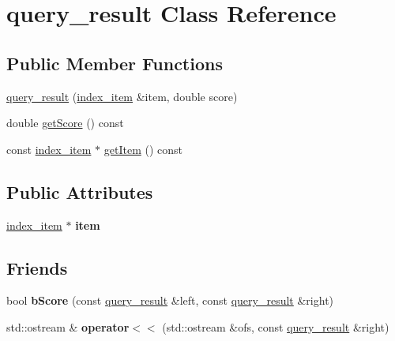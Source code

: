 \hypertarget{classquery__result}{}\section{query\+\_\+result Class Reference}
\label{classquery__result}
\subsection*{Public Member Functions}
\begin{DoxyCompactItemize}
\item 
\hyperlink{classquery__result_a3bfdb6247df84d9076c70a1d41ab2a51}{query\+\_\+result} (\hyperlink{classindex__item}{index\+\_\+item} \&item, double score)
\item 
double \hyperlink{classquery__result_a85702eafe30f0f8bf4c7acb17b761e04}{get\+Score} () const
\item 
const \hyperlink{classindex__item}{index\+\_\+item} $\ast$ \hyperlink{classquery__result_aba6c70d1ea798b10857bcd86df23dfb9}{get\+Item} () const
\end{DoxyCompactItemize}
\subsection*{Public Attributes}
\begin{DoxyCompactItemize}
\item 
\mbox{\label{classquery__result_a57c6edc77797bd83e2d1c9e20a12c12a}} 
\hyperlink{classindex__item}{index\+\_\+item} $\ast$ {\bfseries item}
\end{DoxyCompactItemize}
\subsection*{Friends}
\begin{DoxyCompactItemize}
\item 
\mbox{\label{classquery__result_a92454c7ac646941f959de516a6372409}} 
bool {\bfseries b\+Score} (const \hyperlink{classquery__result}{query\+\_\+result} \&left, const \hyperlink{classquery__result}{query\+\_\+result} \&right)
\item 
\mbox{\label{classquery__result_aa1c9baa38e0636cef7439363df9ba5b3}} 
std\+::ostream \& {\bfseries operator$<$$<$} (std\+::ostream \&ofs, const \hyperlink{classquery__result}{query\+\_\+result} \&right)
\end{DoxyCompactItemize}


